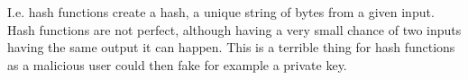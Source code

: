 I.e. hash functions create a hash, a unique string of bytes from a given input.
Hash functions are not perfect, although having a very small chance of two
inputs having the same output it can happen. This is a terrible thing for hash
functions as a malicious user could then fake for example a private key.


